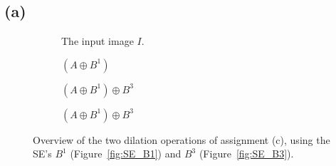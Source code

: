 \documentclass{article}
\begin{document}
\subsection*{(a)}
\begin{figure}[H]
     \centering
     \begin{subfigure}[b]{0.7\textwidth}
         \centering
         
         \caption{The input image $I$.}
         \label{fig:wirebondmask-image}
     \end{subfigure}
     \newline
     \hfill
     \begin{subfigure}[b]{0.33\textwidth}
         \centering
         
         \caption{$(A \oplus B^1)$}
         \label{fig:Bcross}
     \end{subfigure}
     \hfill
     \begin{subfigure}[b]{0.33\textwidth}
         \centering
         
         \caption{$(A \oplus B^1) \oplus B^3$}
         \label{fig:Bsquare}
     \end{subfigure}
     \hfill
     \begin{subfigure}[b]{0.33\textwidth}
         \centering
         
         \caption{$(A \oplus B^1) \oplus B^3$}
         \label{fig:Bbigsquare}
     \end{subfigure}
     
    \caption{Overview of the two dilation operations of assignment (c), using the SE's $B^1$ (Figure~\ref{fig:SE_B1}) and $B^3$ (Figure~\ref{fig:SE_B3}).}
    \label{fig:structuring-elements-overview}
\end{figure}
\end{document}
